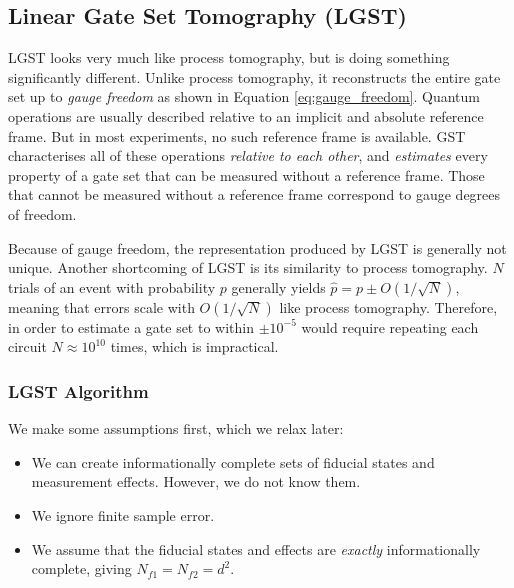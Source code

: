 \subsection{Linear Gate Set Tomography (LGST)}


\ac{LGST} looks very much like process tomography, but is doing something significantly different.
Unlike process tomography, it reconstructs the entire gate set up to \textit{gauge freedom} as shown
in Equation \ref{eq:gauge_freedom}. Quantum operations are usually described relative to an implicit
and absolute reference frame. But in most experiments, no such reference frame is available. GST
characterises all of these operations \textit{relative to each other}, and \textit{estimates} every
property of a gate set that can be measured without a reference frame. Those that cannot be measured
without a reference frame correspond to gauge degrees of freedom.

Because of gauge freedom, the representation produced by \ac{LGST} is generally not unique. Another
shortcoming of \ac{LGST} is its similarity to process tomography. $N$ trials of an event with
probability $p$ generally yields $\hat{p} = p \pm O(1 / \sqrt{N})$, meaning that errors scale with
$O(1 / \sqrt{N})$ like process tomography. Therefore, in order to estimate a gate set to within $\pm
10^{-5}$ would require repeating each circuit $N \approx 10^{10}$ times, which is impractical.


\subsubsection{LGST Algorithm}

We make some assumptions first, which we relax later:
\begin{itemize}
    \item We can create informationally complete sets of fiducial states and measurement effects.
    However, we do not know them.
    \item We ignore finite sample error.
    \item We assume that the fiducial states and effects are \textit{exactly} informationally
    complete, giving $N_{f1} = N_{f2} = d^2$.
\end{itemize}

